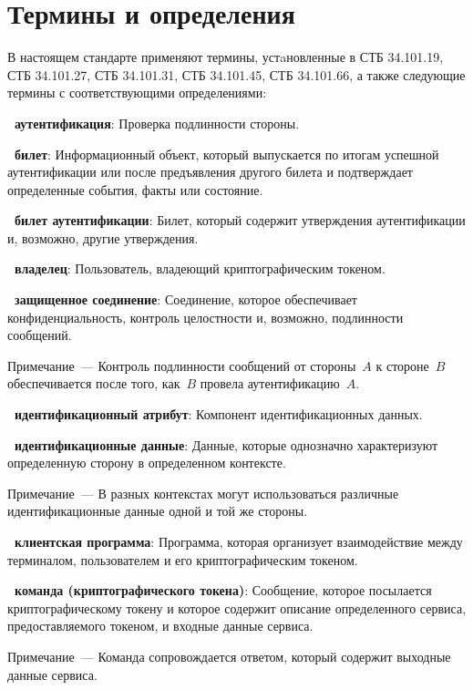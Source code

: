 \chapter{Термины и определения}\label{TERMS}

В настоящем стандарте применяют термины, устaновленные 
в СТБ 34.101.19, СТБ 34.101.27, СТБ 34.101.31, СТБ 34.101.45, 
СТБ 34.101.66, а также следующие термины с соответствующими определениями:

{\bf \thedefctr~аутентификация}:
Проверка подлинности стороны.

{\bf \thedefctr~билет}:
Информационный объект, который выпускается по итогам успешной аутентификации
или после предъявления другого билета и подтверждает определенные 
события, факты или состояние. 

{\bf \thedefctr~билет аутентификации}:
Билет, который содержит утверждения аутентификации и, возможно, другие 
утверждения. 

{\bf \thedefctr~владелец}:
Пользователь, владеющий криптографическим токеном.

{\bf \thedefctr~защищенное соединение}:
Соединение, которое обеспечивает конфиденциальность, 
контроль целостности и, возможно, подлинности сообщений. 

\begin{note}
Примечание~--- Контроль подлинности сообщений от стороны~$A$ к стороне~$B$ 
обеспечивается после того, как~$B$ провела аутентификацию~$A$.
\end{note}

{\bf \thedefctr~идентификационный атрибут}:
Компонент идентификационных данных. 

{\bf \thedefctr~идентификационные данные}:
Данные, которые однозначно характеризуют определенную 
сторону в определенном контексте. 

\begin{note}
Примечание~--- В разных контекстах могут использоваться 
различные идентификационные данные одной и той же стороны.
\end{note}

{\bf \thedefctr~клиентская программа}:
Программа, которая организует взаимодействие между терминалом, 
пользователем и его криптографическим токеном.

{\bf \thedefctr~команда (криптографического токена)}:
Сообщение, которое посылается 
криптографическому токену и которое содержит описание определенного 
сервиса, предоставляемого токеном, и входные данные сервиса. 
%
\begin{note}
Примечание~--- Команда сопровождается ответом, который содержит выходные данные 
сервиса.
\end{note}

